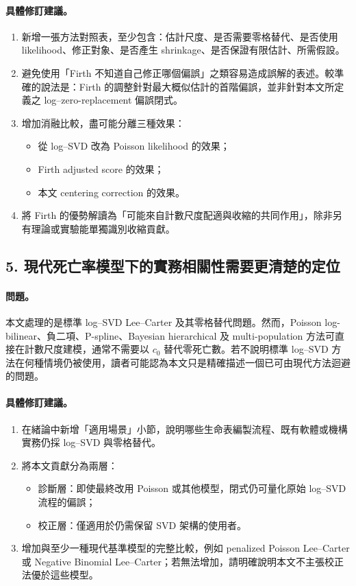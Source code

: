 \documentclass[12pt,a4paper]{article}
\begin{document}
\paragraph{具體修訂建議。}
\begin{enumerate}
  \item 新增一張方法對照表，至少包含：估計尺度、是否需要零格替代、是否使用 likelihood、修正對象、是否產生 shrinkage、是否保證有限估計、所需假設。
  \item 避免使用「Firth 不知道自己修正哪個偏誤」之類容易造成誤解的表述。較準確的說法是：Firth 的調整針對最大概似估計的首階偏誤，並非針對本文所定義之 log--zero-replacement 偏誤閉式。
  \item 增加消融比較，盡可能分離三種效果：
  \begin{itemize}
    \item 從 log--SVD 改為 Poisson likelihood 的效果；
    \item Firth adjusted score 的效果；
    \item 本文 centering correction 的效果。
  \end{itemize}
  \item 將 Firth 的優勢解讀為「可能來自計數尺度配適與收縮的共同作用」，除非另有理論或實驗能單獨識別收縮貢獻。
\end{enumerate}

\subsection*{5. 現代死亡率模型下的實務相關性需要更清楚的定位}

\paragraph{問題。}
本文處理的是標準 log--SVD Lee--Carter 及其零格替代問題。然而，Poisson log-bilinear、負二項、P-spline、Bayesian hierarchical 及 multi-population 方法可直接在計數尺度建模，通常不需要以 $c_0$ 替代零死亡數。若不說明標準 log--SVD 方法在何種情境仍被使用，讀者可能認為本文只是精確描述一個已可由現代方法迴避的問題。

\paragraph{具體修訂建議。}
\begin{enumerate}
  \item 在緒論中新增「適用場景」小節，說明哪些生命表編製流程、既有軟體或機構實務仍採 log--SVD 與零格替代。
  \item 將本文貢獻分為兩層：
  \begin{itemize}
    \item 診斷層：即使最終改用 Poisson 或其他模型，閉式仍可量化原始 log--SVD 流程的偏誤；
    \item 校正層：僅適用於仍需保留 SVD 架構的使用者。
  \end{itemize}
  \item 增加與至少一種現代基準模型的完整比較，例如 penalized Poisson Lee--Carter 或 Negative Binomial Lee--Carter；若無法增加，請明確說明本文不主張校正法優於這些模型。
\end{enumerate}
\end{document}
